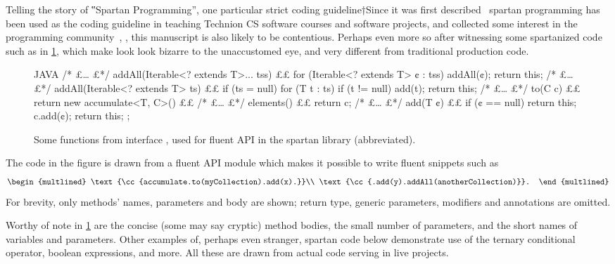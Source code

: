 Telling the story of ‟Spartan Programming”, one particular strict coding
guideline†{Since it was first described~\cite{TOOLS:98:Santa:Barbara}
  spartan programming has been used as the coding guideline in teaching
  Technion CS software courses and software projects, and collected some interest
  in the programming community~\cite{Coding:Horror:Spartan}}, \Java, this
  manuscript is also likely to be contentious. Perhaps even more so after
witnessing some spartanized code such as in \cref{figure:accumulate}, which
make look look bizarre to the unaccustomed eye, and very different from
traditional production \Java code.

\begin{figure}
\caption{\label{figure:accumulate}
  Some functions from interface ,
  used for fluent API in the spartan library (abbreviated).
  }
    \centering
\begin{code}[minipage,width=\columnwidth]{JAVA}
/* £… £*/ addAll(Iterable<? extends T>... tss) {££
  for (Iterable<? extends T> ¢ : tss)
    addAll(¢);
  return this;
}
/* £… £*/ addAll(Iterable<? extends T> ts) {££
  if (ts = null)
    for (T t : ts)
      if (t != null)
        add(t);
  return this;
}
/* £… £*/ to(C c) {££
  return new accumulate<T, C>() {££
    /* £… £*/ elements() {££
        return c;
    }
    /* £… £*/ add(T ¢) {££
        if (¢ == null)
          return this;
        c.add(¢);
        return this;
    }
  };
}
\end{code}
\end{figure}

The code in the figure is drawn from a fluent API module which makes it possible to write fluent snippets
such as \[
  \begin{multlined}
    \text{\cc{accumulate.to(myCollection).add(x).}}\\
    \text{\cc{.add(y).addAll(anotherCollection)}}.
  \end{multlined}
\]
For brevity, only methods' names, parameters and body are shown;
return type, generic parameters, modifiers and annotations are omitted.

Worthy of note in \cref{figure:accumulate} are the concise (some may say
cryptic) method bodies, the small number of parameters, and the short names of
variables and parameters. Other examples of, perhaps even stranger, spartan
code below demonstrate use of the ternary conditional operator, boolean
expressions, and more. All these are drawn from actual code serving in live
projects.


